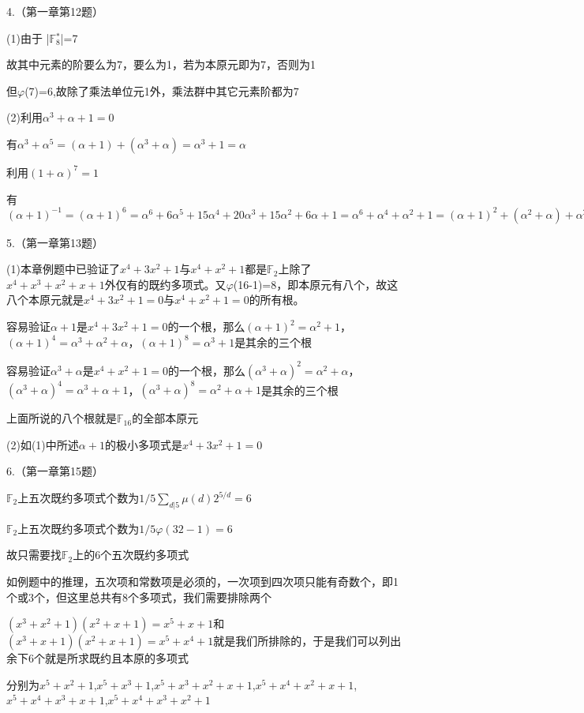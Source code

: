 \documentclass{ctexart}
\begin{document}
    4.（第一章第12题）
    
    (1)由于 |$\mathbb{F}$$_{8}^{*}$|=7
    
    故其中元素的阶要么为7，要么为1，若为本原元即为7，否则为1
    
    但$\varphi$(7)=6,故除了乘法单位元1外，乘法群中其它元素阶都为7
    
    (2)利用$\alpha^3+\alpha+1=0$
    
    有$\alpha^3+\alpha^5=(\alpha+1)+(\alpha^3+\alpha)=\alpha^3+1=\alpha$
    
    利用$(1+\alpha)^7=1$
    
   	有$(\alpha+1)^{-1}=(\alpha+1)^{6}=\alpha^6+6\alpha^5+15\alpha^4+20\alpha^3+15\alpha^2+6\alpha+1=\alpha^6+\alpha^4+\alpha^2+1=(\alpha+1)^2+(\alpha^2+\alpha)+\alpha^2+1=\alpha^2+\alpha$
   	
   	5.（第一章第13题）
   	
   	(1)本章例题中已验证了$x^4+3x^2+1$与$x^4+x^2+1$都是$\mathbb{F}$$_{2}$上除了$x^4+x^3+x^2+x+1$外仅有的既约多项式。又$\varphi$(16-1)=8，即本原元有八个，故这八个本原元就是$x^4+3x^2+1=0$与$x^4+x^2+1=0$的所有根。
   	
   	容易验证$\alpha+1$是$x^4+3x^2+1=0$的一个根，那么$(\alpha+1)^2=\alpha^2 + 1$，$(\alpha+1)^4=\alpha^3 + \alpha^2 + \alpha$，$(\alpha+1)^8=\alpha^3+1$是其余的三个根
   	
   	容易验证$\alpha^3+\alpha$是$x^4+x^2+1=0$的一个根，那么$(\alpha^3+\alpha)^2=\alpha^2 + \alpha$，$(\alpha^3+\alpha)^4=\alpha^3 + \alpha + 1$，$(\alpha^3+\alpha)^8=\alpha^2+\alpha+1$是其余的三个根
   	
   	上面所说的八个根就是$\mathbb{F}$$_{16}$的全部本原元
   	
   	(2)如(1)中所述$\alpha+1$的极小多项式是$x^4+3x^2+1=0$
   	
   	6.（第一章第15题）
   	
   	$\mathbb{F}$$_{2}$上五次既约多项式个数为$1/5\sum_{d|5}\mu(d)2^{5/d}=6$
   	
   	$\mathbb{F}$$_{2}$上五次既约多项式个数为$1/5\varphi(32-1)=6$
   	
   	故只需要找$\mathbb{F}$$_{2}$上的6个五次既约多项式
   	
   	如例题中的推理，五次项和常数项是必须的，一次项到四次项只能有奇数个，即1个或3个，但这里总共有8个多项式，我们需要排除两个
   	
   	$(x^3+x^2+1)(x^2+x+1)=x^5+x+1$和$(x^3+x+1)(x^2+x+1)=x^5+x^4+1$就是我们所排除的，于是我们可以列出余下6个就是所求既约且本原的多项式
   	
   	分别为$x^5+x^2+1$,$x^5+x^3+1$,$x^5+x^3+x^2+x+1$,$x^5+x^4+x^2+x+1$,$x^5+x^4+x^3+x+1$,$x^5+x^4+x^3+x^2+1$
   	
\end{document}
